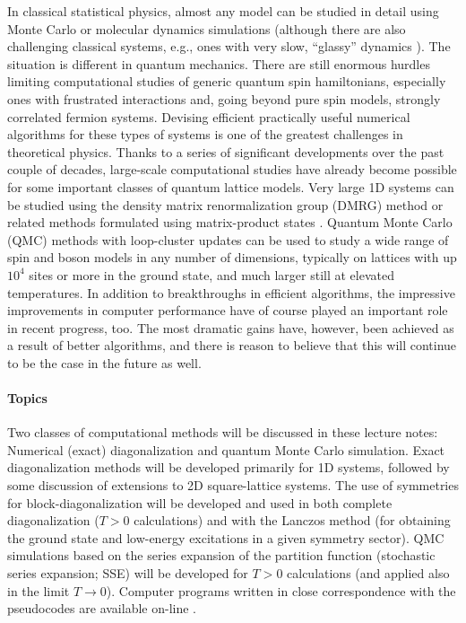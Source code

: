 \documentclass[draft,numberedheadings]{aipproc}
\begin{document}
In classical statistical physics, almost any model can be studied in detail using Monte Carlo or molecular dynamics simulations (although
there are also challenging classical systems, e.g., ones with very slow, ``glassy'' dynamics \cite{fernandez}). The situation is different in quantum mechanics. 
There are still enormous hurdles limiting computational studies of generic quantum spin hamiltonians, especially ones with frustrated 
interactions and, going beyond pure spin models, strongly correlated fermion systems. Devising efficient practically useful numerical algorithms 
for these types of systems is one of the greatest challenges in theoretical physics. Thanks to a series of significant developments over the 
past couple of decades, large-scale computational studies have already become possible for some important classes of quantum lattice models. 
Very large 1D systems can be studied using the density matrix renormalization group (DMRG) method \cite{white1,schollwock2} or 
related methods formulated using matrix-product states \cite{verstraete1,mcculloch}. Quantum Monte Carlo (QMC) methods with loop-cluster updates 
\cite{evertz1,prokofev96,syljuasen02} can be used to study a wide range of spin and boson models in any number of dimensions, typically on lattices with up 
$10^4$ sites or more in the ground state, and much larger still at elevated temperatures. In addition to breakthroughs in efficient algorithms, the 
impressive improvements in computer performance have of course played an important role in recent progress, too. The most dramatic gains have, however, 
been achieved as a result of better algorithms, and there is reason to believe that this will continue to be the case in the future as well.

\paragraph{Topics}

Two classes of computational methods will be discussed in these lecture notes: Numerical (exact) diagonalization and quantum Monte Carlo simulation. Exact 
diagonalization methods will be developed primarily for 1D systems, followed by some discussion of extensions to 2D square-lattice systems. 
The use of symmetries for block-diagonalization will be developed and used in both complete diagonalization ($T>0$ 
calculations) and with the Lanczos method (for obtaining the ground state and low-energy excitations in a given symmetry sector). QMC simulations based on the 
series expansion of the partition function (stochastic series expansion; SSE) will be developed for $T>0$ calculations (and applied also in the limit $T\to 0$). 
Computer programs written in close correspondence with the pseudocodes are available on-line \cite{sandvikwebsite}. 
\end{document}
